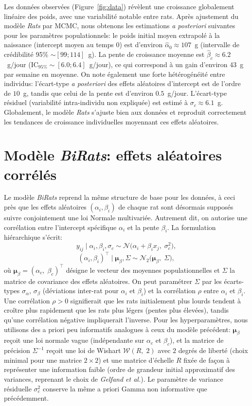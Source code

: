 \documentclass[12pt]{article}
\begin{document}
Les données observées (Figure~\ref{fig:data}) révèlent une croissance globalement linéaire des poids, avec une variabilité notable entre rats. Après ajustement du modèle \textit{Rats} par MCMC, nous obtenons les estimations \emph{a posteriori} suivantes pour les paramètres populationnels: le poids initial moyen extrapolé à la naissance (intercept moyen au temps $0$) est d'environ $\hat{\alpha}_0 \approx 107$~g (intervalle de crédibilité 95\% $\sim[99;114]$~g). La pente de croissance moyenne est $\hat{\beta}_c \approx 6.2$~g/jour (IC$_{95\%}\sim[6.0;6.4]$~g/jour), ce qui correspond à un gain d'environ 43~g par semaine en moyenne. On note également une forte hétérogénéité entre individus: l'écart-type \emph{a posteriori} des effets aléatoires d'intercept est de l'ordre de $10$~g, tandis que celui de la pente est d'environ $0.5$~g/jour. L'écart-type résiduel (variabilité intra-individu non expliquée) est estimé à $\sigma_c \approx 6.1$~g. Globalement, le modèle \textit{Rats} s'ajuste bien aux données et reproduit correctement les tendances de croissance individuelles moyennant ces effets aléatoires.

\section{Modèle \textit{BiRats}: effets aléatoires corrélés}
Le modèle \textit{BiRats} reprend la même structure de base pour les données, à ceci près que les effets aléatoires $(\alpha_i,\beta_i)$ de chaque rat sont désormais supposés suivre conjointement une loi Normale multivariée. Autrement dit, on autorise une corrélation entre l'intercept spécifique $\alpha_i$ et la pente $\beta_i$. La formulation hiérarchique s'écrit:
\[
y_{ij} \mid \alpha_i,\beta_i,\sigma_c \sim \mathcal{N}\!\big(\alpha_i + \beta_i x_j,\;\sigma_c^2\big),
\] 
\[
(\alpha_i,\beta_i)^\top \mid \boldsymbol{\mu}_\beta,\Sigma \sim \mathcal{N}_2\!\big(\boldsymbol{\mu}_\beta,\;\Sigma\big),
\] 
où $\boldsymbol{\mu}_\beta=(\alpha_c,\;\beta_c)^\top$ désigne le vecteur des moyennes populationnelles et $\Sigma$ la matrice de covariance des effets aléatoires. On peut paramétrer $\Sigma$ par les écarts-types $\sigma_{\alpha}$, $\sigma_{\beta}$ (déviations inter-rat pour $\alpha_i$ et $\beta_i$) et la corrélation $\rho$ entre $\alpha_i$ et $\beta_i$. Une corrélation $\rho>0$ signifierait que les rats initialement plus lourds tendent à croître plus rapidement que les rats plus légers (pentes plus élevées), tandis qu'une corrélation négative impliquerait l'inverse. Pour les hyperparamètres, nous utilisons des a priori peu informatifs analogues à ceux du modèle précédent: $\boldsymbol{\mu}_\beta$ reçoit une loi normale vague (indépendante sur $\alpha_c$ et $\beta_c$), et la matrice de précision $\Sigma^{-1}$ reçoit une loi de Wishart $\mathcal{W}(R,\;2)$ avec $2$ degrés de liberté (choix minimal pour une matrice $2\times2$) et une matrice d'échelle $R$ fixée de façon à représenter une information faible (ordre de grandeur initial approximatif des variances, reprenant le choix de \textit{Gelfand et al.}). Le paramètre de variance résiduelle $\sigma_c^2$ conserve la même a priori Gamma non informative que précédemment.
\end{document}
